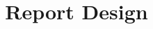 \documentclass[twoside,final]{hcmut-report}
\title{Report Design}
\begin{document}
\coverpage%


\tableofcontents





\end{document}
